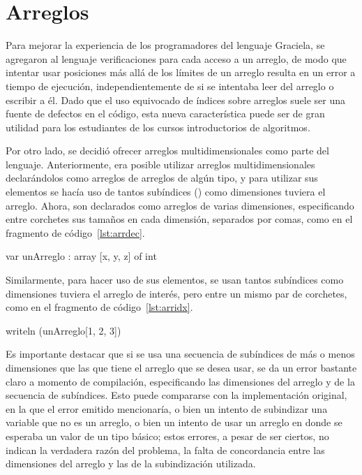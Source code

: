 \section{Arreglos}

Para mejorar la experiencia de los programadores del lenguaje Graciela, se
agregaron al lenguaje verificaciones para cada acceso a un arreglo, de modo que
intentar usar posiciones más allá de los límites de un arreglo resulta en un
error a tiempo de ejecución, independientemente de si se intentaba leer del
arreglo o escribir a él. Dado que el uso equivocado de índices sobre arreglos
suele ser una fuente de defectos en el código, esta nueva característica puede
ser de gran utilidad para los estudiantes de los cursos introductorios de
algoritmos.

Por otro lado, se decidió ofrecer arreglos multidimensionales como parte del
lenguaje. Anteriormente, era posible utilizar arreglos multidimensionales
declarándolos como arreglos de arreglos de algún tipo, y para utilizar sus
elementos se hacía uso de tantos subíndices (\ingra{[i]}) como dimensiones
tuviera el arreglo. Ahora, son declarados como arreglos de varias dimensiones,
especificando entre corchetes sus tamaños en cada dimensión, separados por
comas, como en el fragmento de código~\ref{lst:arrdec}.

\begin{gracielacode}[caption=Declaración de variable de tipo arreglo, label=lst:arrdec]
var unArreglo : array [x, y, z] of int
\end{gracielacode}

Similarmente, para hacer uso de sus elementos, se usan tantos subíndices como
dimensiones tuviera el arreglo de interés, pero entre un mismo par de corchetes,
como en el fragmento de código~\ref{lst:arridx}.

\begin{gracielacode}[caption=Acceso a variable de tipo arreglo, label=lst:arridx]
writeln (unArreglo[1, 2, 3])
\end{gracielacode}

Es importante destacar que si se usa una secuencia de subíndices de más o menos
dimensiones que las que tiene el arreglo que se desea usar, se da un error
bastante claro a momento de compilación, especificando las dimensiones del
arreglo y de la secuencia de subíndices. Esto puede compararse con la
implementación original, en la que el error emitido mencionaría, o bien un
intento de subindizar una variable que no es un arreglo, o bien un intento de
usar un arreglo en donde se esperaba un valor de un tipo básico; estos errores,
a pesar de ser ciertos, no indican la verdadera razón del problema, la falta de
concordancia entre las dimensiones del arreglo y las de la subindización
utilizada.

